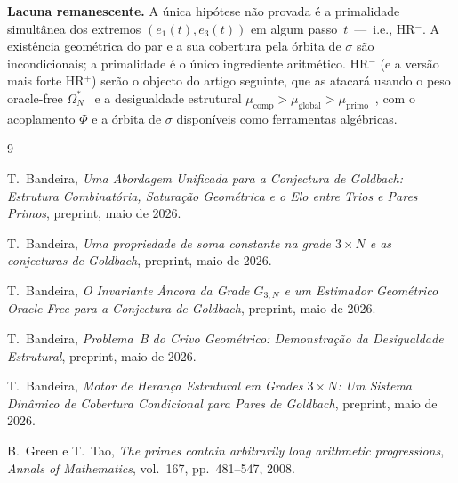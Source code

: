 \documentclass[12pt, a4paper]{article}
\theoremstyle{plain}
\theoremstyle{definition}
\theoremstyle{remark}
\begin{document}
	\medskip
	\noindent\textbf{Lacuna remanescente.}
	A única hipótese não provada é a primalidade simultânea dos
	extremos $(e_1(t),e_3(t))$ em algum passo~$t$~---~i.e., HR$^-$.
	A existência geométrica do par e a sua cobertura pela órbita de
	$\sigma$ são incondicionais; a primalidade é o único ingrediente
	aritmético.  HR$^-$ (e a versão mais forte HR$^+$) serão o objecto
	do artigo seguinte, que as atacará usando o peso oracle-free
	$\Omega_N^*$~\cite{peso} e a desigualdade estrutural
	$\mu_{\text{comp}}>\mu_{\text{global}}>\mu_{\text{primo}}$~\cite{problemaB},
	com o acoplamento $\Phi$ e a órbita de $\sigma$ disponíveis como
	ferramentas algébricas.
	
	\begin{thebibliography}{9}
		
		T.~Bandeira,
		\textit{Uma Abordagem Unificada para a Conjectura de Goldbach:
			Estrutura Combinatória, Saturação Geométrica e o Elo entre Trios
			e Pares Primos}, preprint, maio de 2026.
		
		T.~Bandeira,
		\textit{Uma propriedade de soma constante na grade $3\times N$
			e as conjecturas de Goldbach}, preprint, maio de 2026.
		
		T.~Bandeira,
		\textit{O Invariante Âncora da Grade $G_{3,N}$ e um Estimador
			Geométrico Oracle-Free para a Conjectura de Goldbach},
		preprint, maio de 2026.
		
		T.~Bandeira,
		\textit{Problema~B do Crivo Geométrico: Demonstração da
			Desigualdade Estrutural}, preprint, maio de 2026.
		
		T.~Bandeira,
		\textit{Motor de Herança Estrutural em Grades $3\times N$:
			Um Sistema Dinâmico de Cobertura Condicional para Pares de
			Goldbach}, preprint, maio de 2026.
		
		B.~Green e T.~Tao,
		\textit{The primes contain arbitrarily long arithmetic
			progressions},
		\textit{Annals of Mathematics}, vol.~167, pp.~481--547, 2008.
		
	\end{thebibliography}
	
\end{document}
